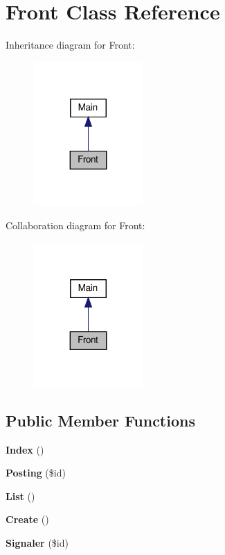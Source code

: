 \section{Front Class Reference}
\label{class_src_1_1_controllers_1_1_front}


Inheritance diagram for Front\+:
\nopagebreak
\begin{figure}[H]
\begin{center}
\leavevmode
\includegraphics[width=119pt]{class_src_1_1_controllers_1_1_front__inherit__graph}
\end{center}
\end{figure}


Collaboration diagram for Front\+:
\nopagebreak
\begin{figure}[H]
\begin{center}
\leavevmode
\includegraphics[width=119pt]{class_src_1_1_controllers_1_1_front__coll__graph}
\end{center}
\end{figure}
\subsection*{Public Member Functions}
\begin{DoxyCompactItemize}
\item 
\textbf{ Index} ()
\item 
\textbf{ Posting} (\$id)
\item 
\textbf{ List} ()
\item 
\textbf{ Create} ()
\item 
\textbf{ Signaler} (\$id)
\end{DoxyCompactItemize}
